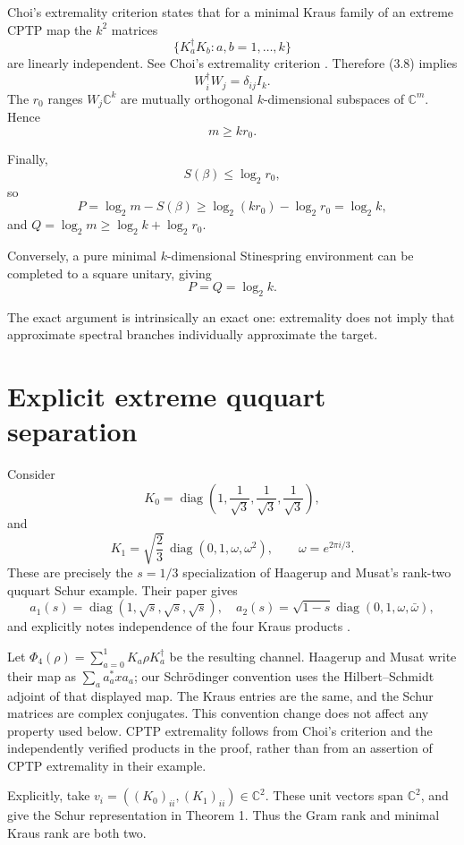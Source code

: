 \documentclass[11pt,a4paper]{article}
\numberwithin{equation}{section}
\begin{document}
Choi's extremality criterion states that for a minimal Kraus family of
an extreme CPTP map the \(k^2\) matrices \[
\{K_a^\dagger K_b:a,b=1,\ldots,k\}
\] are linearly independent. See Choi's extremality criterion
\citep{choi1975}. Therefore (3.8) implies \[
W_i^\dagger W_j=\delta_{ij}I_k.
\tag{3.9}
\] The \(r_0\) ranges \(W_j\mathbb C^k\) are mutually orthogonal
\(k\)-dimensional subspaces of \(\mathbb C^m\). Hence \[
m\ge kr_0.
\]

Finally, \[
S(\beta)\le\log_2r_0,
\] so \[
P
=\log_2m-S(\beta)
\ge
\log_2(kr_0)-\log_2r_0
=\log_2k,
\] and \(Q=\log_2m\ge\log_2k+\log_2r_0\).

Conversely, a pure minimal \(k\)-dimensional Stinespring environment can
be completed to a square unitary, giving \[
P=Q=\log_2k.
\]

The exact argument is intrinsically an exact one: extremality does not
imply that approximate spectral branches individually approximate the
target.

\section{Explicit extreme ququart
separation}\label{explicit-extreme-ququart-separation}

Consider \[
K_0=
\operatorname{diag}
\left(
1,\frac1{\sqrt3},\frac1{\sqrt3},\frac1{\sqrt3}
\right),
\] and \[
K_1=
\sqrt{\frac23}\,
\operatorname{diag}(0,1,\omega,\omega^2),
\qquad
\omega=e^{2\pi i/3}.
\tag{4.1}
\] These are precisely the \(s=1/3\) specialization of Haagerup and
Musat's rank-two ququart Schur example. Their paper gives \[
a_1(s)=\operatorname{diag}(1,\sqrt s,\sqrt s,\sqrt s),
\quad
a_2(s)=\sqrt{1-s}\operatorname{diag}
(0,1,\omega,\bar\omega),
\] and explicitly notes independence of the four Kraus products
\citep[Example 3.2]{haagerup2011}.

Let \(\Phi_4(\rho)=\sum_{a=0}^1K_a\rho K_a^\dagger\) be the resulting
channel. Haagerup and Musat write their map as \(\sum_a a_a^*x a_a\);
our Schrödinger convention uses the Hilbert--Schmidt adjoint of that
displayed map. The Kraus entries are the same, and the Schur matrices
are complex conjugates. This convention change does not affect any
property used below. CPTP extremality follows from Choi's criterion and
the independently verified products in the proof, rather than from an
assertion of CPTP extremality in their example.

Explicitly, take \(v_i=((K_0)_{ii},(K_1)_{ii})\in\mathbb C^2\). These
unit vectors span \(\mathbb C^2\), and give the Schur representation in
Theorem 1. Thus the Gram rank and minimal Kraus rank are both two.
\end{document}
